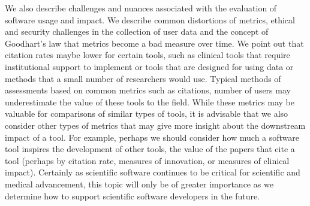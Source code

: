 \documentclass{article}
\begin{document}
We also describe challenges and nuances associated with the evaluation of software usage and impact. We describe common distortions of metrics, ethical and security challenges in the collection of user data and the concept of Goodhart's law that metrics become a bad measure over time. We point out that citation rates maybe lower for certain tools, such as clinical tools that require institutional support to implement or tools that are designed for using data or methods that a small number of researchers would use. Typical methods of assessments based on common metrics such as citations, number of users may underestimate the value of these tools to the field. While these metrics may be valuable for comparisons of similar types of tools, it is advisable that we also consider other types of metrics that may give more insight about the downstream impact of a tool. For example, perhaps we should consider how much a software tool inspires the development of other tools, the value of the papers that cite a tool (perhaps by citation rate, measures of innovation, or measures of clinical impact). Certainly as scientific software continues to be critical for scientific and medical advancement, this topic will only be of greater importance as we determine how to support scientific software developers in the future. 
 
 














 
 


\end{document}
